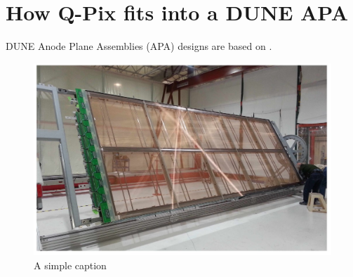 \section{How Q-Pix fits into a DUNE APA}

DUNE Anode Plane Assemblies (APA) designs are based on \citep{DUNE-FD_TDRv4:Abi_2020}.

\begin{figure}[ht!]
\centering
\includegraphics[width=\textwidth]{images/dune_fd_tdr_apa_image.jpg}
\caption{A simple caption \citep{DUNE-FD_TDRv4:Abi_2020}}
\end{figure}

